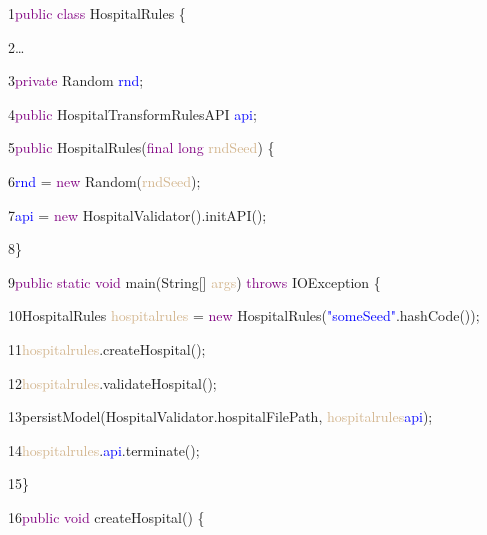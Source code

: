 {

1\hspace{0.5cm}\textcolor{Purple}{public class} HospitalRules \{

2\hspace{0.5cm}…	

3\hspace{1cm}\textcolor{Purple}{private} Random \textcolor{blue}{rnd};

4\hspace{1cm}\textcolor{Purple}{public} HospitalTransformRulesAPI \textcolor{blue}{api};

5\hspace{1cm}\textcolor{Purple}{public} HospitalRules(\textcolor{Purple}{final long} \textcolor{Tan}{rndSeed}) \{

6\hspace{1.5cm}\textcolor{blue}{rnd} = \textcolor{Purple}{new} Random(\textcolor{Tan}{rndSeed});

7\hspace{1.5cm}\textcolor{blue}{api} = \textcolor{Purple}{new} HospitalValidator().initAPI();

8\hspace{1cm}\}

9\hspace{1cm}\textcolor{Purple}{public static void} main(String[] \textcolor{Tan}{args}) \textcolor{Purple}{throws} IOException \{

10\hspace{1.5cm}HospitalRules \textcolor{Tan}{hospitalrules} = \textcolor{Purple}{new} HospitalRules(\textcolor{blue}{"someSeed"}.hashCode());

11\hspace{1.5cm}\textcolor{Tan}{hospitalrules}.createHospital();

12\hspace{1.5cm}\textcolor{Tan}{hospitalrules}.validateHospital();

13\hspace{1.5cm}persistModel(HospitalValidator.hospitalFilePath, \textcolor{Tan}{hospitalrules}\textcolor{blue}{api});

14\hspace{1.5cm}\textcolor{Tan}{hospitalrules}.\textcolor{blue}{api}.terminate();

15\hspace{1.0cm}\}

16\hspace{1.0cm}\textcolor{Purple}{public void} createHospital() \{

}
